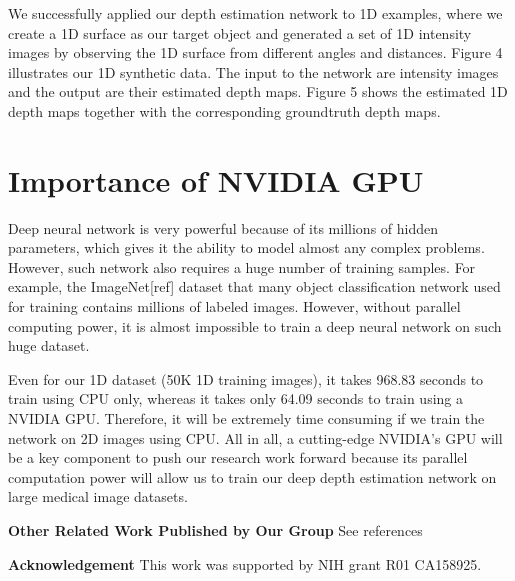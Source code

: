 \documentclass{llncs}
\begin{document}
We successfully applied our depth estimation network to 1D examples, where we create a 1D surface as our target object and generated a set of 1D intensity images by observing the 1D surface  from different angles and distances. Figure 4 illustrates our 1D synthetic data. The input to the network are intensity images and the output are their estimated depth maps. Figure 5 shows the estimated 1D depth maps together with the corresponding groundtruth depth maps.

\section{Importance of NVIDIA GPU}

Deep neural network is very powerful because of its millions of hidden parameters, which gives it the ability to model almost any complex problems. However, such network also requires a huge number of training samples. For example, the ImageNet[ref] dataset that many object classification network used for training contains millions of labeled images. However, without parallel computing power, it is almost impossible to train a deep neural network on such huge dataset. 



Even for our 1D dataset (50K 1D training images), it takes 968.83 seconds to train using CPU only, whereas it takes only 64.09 seconds to train using a NVIDIA GPU.  Therefore, it will be extremely time consuming if we train the network on 2D images using CPU. All in all, a cutting-edge NVIDIA’s GPU will be a key component to push our research work forward because its parallel computation power will allow us to train our deep depth estimation network on large medical image datasets.



\textbf{Other Related Work Published by Our Group}
See references \cite{zhao2014,zhao2015}

\textbf{Acknowledgement} This work was supported by NIH grant R01 CA158925.










\end{document}
